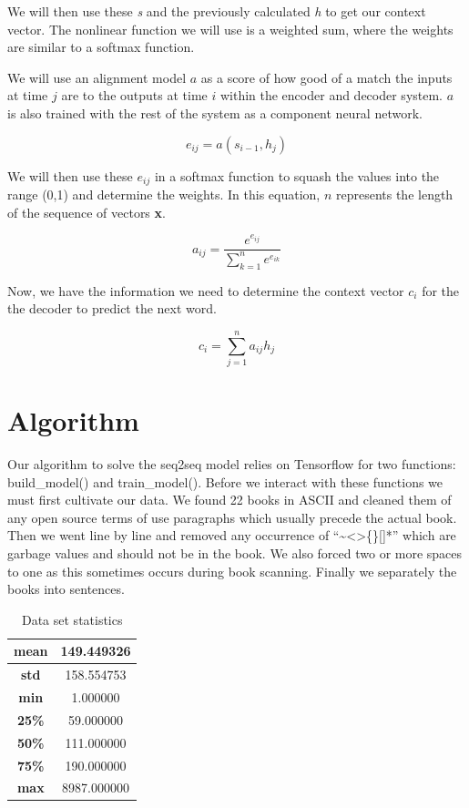 \documentclass[11pt,a4paper]{scrartcl}
\theoremstyle{definition}
\begin{document}
We will then use these \textit{s} and the previously calculated \textit{h} to get our context vector. The nonlinear function we will use is a weighted sum, where the weights are similar to a softmax function. \newline

We will use an alignment model $a$ as a score of how good of a match the inputs at time $j$ are to the outputs at time $i$ within the encoder and decoder system. $a$ is also trained with the rest of the system as a component neural network.

\[e_{ij} = a(s_{i-1},h_j)\]

We will then use these $e_{ij}$ in a softmax function to squash the values into the range (0,1) and determine the weights. In this equation, $n$ represents the length of the sequence of vectors \textbf{x}.

\[a_{ij} = \frac{e^{e_{ij}}}{\sum_{k=1}^{n}e^{e_{ik}}}\]

Now, we have the information we need to determine the context vector $c_i$ for the the decoder to predict the next word.

\[c_i = \sum_{j=1}^na_{ij}h_j\]

\section{Algorithm}
Our algorithm to solve the seq2seq model relies on Tensorflow for two functions: build\_model() and train\_model(). Before we interact with these functions we must first cultivate our data. We found 22 books in ASCII and cleaned them of any open source terms of use paragraphs which usually precede the actual book. Then we went line by line and removed any occurrence of “\textasciitilde<>\{\}[]*” which are garbage values and should not be in the book. We also forced two or more spaces to one as this sometimes occurs during book scanning. Finally we separately the books into sentences.\newline

\FloatBarrier
\begin{table}
\begin{center}
\begin{tabular}{ |c|c|} 
\hline
\textbf{mean} & 149.449326 \\
\hline
\textbf{std} & 158.554753 \\
\hline
\textbf{min} & 1.000000 \\
\hline
\textbf{25\%} & 59.000000 \\
\hline
\textbf{50\%} & 111.000000 \\
\hline
\textbf{75\%} & 190.000000 \\
\hline
\textbf{max} & 8987.000000 \\
\hline
\end{tabular}
\caption{Data set statistics} 
\label{datastats}
\end{center}
\end{table}
\end{document}
